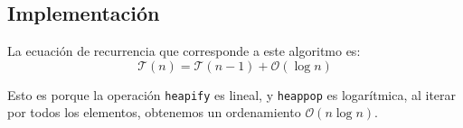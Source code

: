 \subsection{Implementaci\'on}



La ecuaci\'on de recurrencia que corresponde a este algoritmo es: 
\begin{equation*} %
    \mathcal{T}(n) = \mathcal{T}\left(n - 1\right) + \mathcal{O}\left(\log n\right)
\end{equation*}

Esto es porque la operaci\'on \texttt{heapify} es lineal, y \texttt{heappop} es logar\'itmica, al iterar por todos los elementos, obtenemos un ordenamiento $\mathcal{O}\left(n \log n\right)$.

